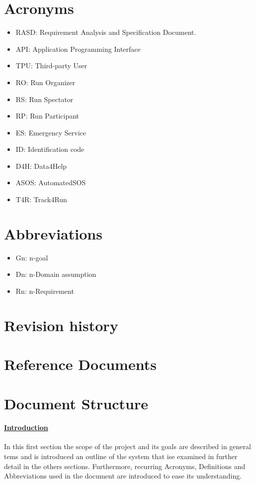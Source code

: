 \section{Acronyms}
\begin{itemize}
\item RASD: Requirement Analysis and Specification Document. 
\item API: Application Programming Interface
\item TPU: Third-party User
\item RO: Run Organizer 
\item	RS: Run Spectator 
\item	RP: Run Participant 
\item	ES: Emergency Service 
\item	ID: Identification code
\item	D4H: Data4Help
\item	ASOS: AutomatedSOS
\item	T4R: Track4Run
\end{itemize}

\section{Abbreviations}
\begin{itemize}
\item Gn: n-goal
\item Dn: n-Domain assumption
\item Rn: n-Requirement
\end{itemize}

\section{Revision history}
\section{Reference Documents }
\section{Document Structure}
\paragraph{\hyperref[sect:introduction]{Introduction}} In this first section the scope of the project and its goals are described in general tems and is introduced an outline of the system that ise examined in further detail in the others sections. Furthermore, recurring Acronyms, Definitions and Abbreviations used in the document are introduced to ease its understanding.
